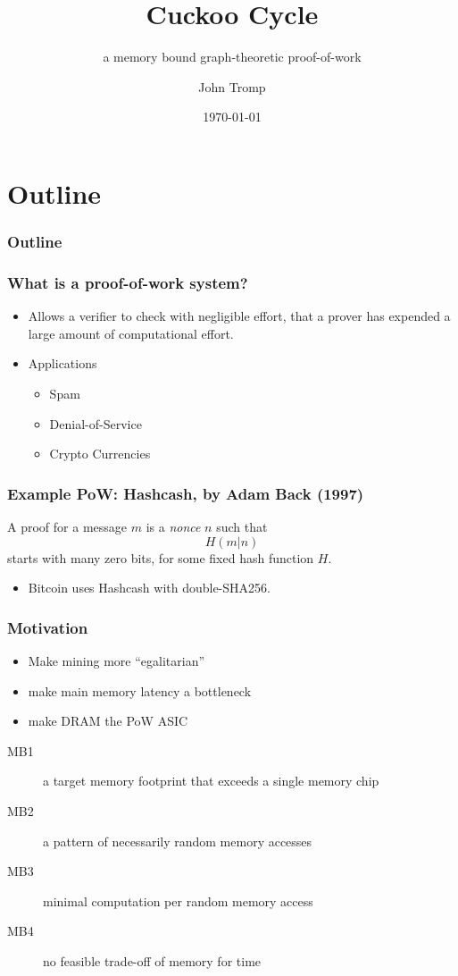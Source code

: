\documentclass{beamer}
\title{Cuckoo Cycle}
\subtitle{a memory bound graph-theoretic proof-of-work}
\author{John Tromp}
\date{\today}
\begin{document}
\begin{frame}
  \titlepage
\end{frame}

\section*{Outline}
\begin{frame}
\frametitle{Outline}
  \tableofcontents
\end{frame}

\begin{frame}
\frametitle{What is a proof-of-work system?}
\begin{itemize}
\item
Allows a verifier to check with negligible effort, that a prover has expended a large amount of computational effort.
\pause
\item {Applications}
\begin{itemize}
\item Spam
\pause
\item Denial-of-Service
\pause
\item Crypto Currencies
\end{itemize}
\end{itemize}
\end{frame}

\begin{frame}
\frametitle{Example PoW: Hashcash, by Adam Back (1997)}
A \alert{proof} for a message $m$ is a {\em nonce} $n$ such that
\begin{equation*}
H(m|n)
\end{equation*} starts with many zero bits,
for some fixed hash function $H$.
\pause
\begin{itemize}
\item
Bitcoin uses Hashcash with double-SHA256.
\end{itemize}
\end{frame}

\begin{frame}
\frametitle{Motivation}
\begin{itemize}
\item Make mining more ``egalitarian''
\pause
\item make main memory latency a bottleneck
\pause
\item make DRAM the PoW ASIC
\end{itemize}
\pause
\begin{description}
\item[MB1] a target memory footprint that exceeds a single memory chip
\pause
\item[MB2] a pattern of necessarily random memory accesses
\pause
\item[MB3] minimal computation per random memory access
\pause
\item[MB4] no feasible trade-off of memory for time
\pause
\end{description}
\end{frame}
\end{document}
